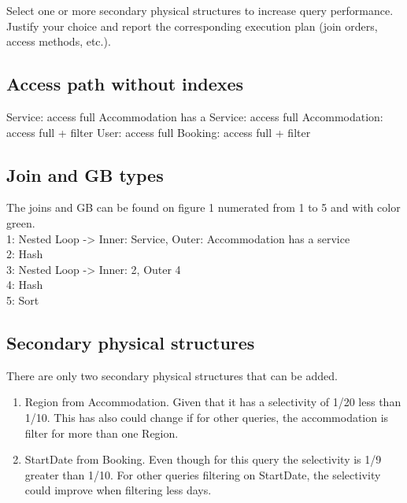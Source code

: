 \begin{question}
    Select one or more secondary physical structures to increase query
    performance. Justify your choice and report the corresponding
    execution plan (join orders, access methods, etc.).
    \subsection{Access path without indexes}
    Service: access full
    Accommodation has a Service: access full
    Accommodation: access full + filter
    User: access full
    Booking: access full + filter
    \subsection{Join and GB types}
    The joins and GB can be found on figure 1 numerated from 1 to 5 and with color green.\\
    1: Nested Loop -> Inner: Service, Outer: Accommodation has a service\\
    2: Hash\\
    3: Nested Loop -> Inner: 2, Outer 4\\
    4: Hash\\
    5: Sort\\
    \subsection{Secondary physical structures}
    There are only two secondary physical structures that can be added.\\
    \begin{enumerate}
        \item Region from Accommodation. Given that it has a selectivity of 1/20 less than 1/10. This has also could change if for other
        queries, the accommodation is filter for more than one Region.
        \item StartDate from Booking. Even though for this query the selectivity is 1/9 greater than 1/10.
        For other queries filtering on StartDate, the selectivity could improve when filtering less days.
    \end{enumerate}



\end{question}
\begin{anwer}
\end{anwer}
